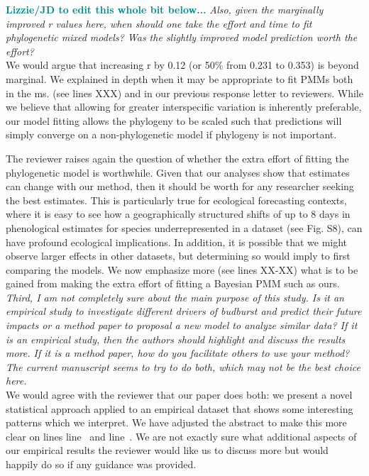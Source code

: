 \documentclass[11pt]{article}
\newcommand{\lr}[1]{line~\lineref{#1}}
\begin{document}
\textcolor{teal}{{\bf Lizzie/JD to edit this whole bit below...}}
\emph{Also, given the marginally improved r values here, when should one take the effort and time to fit phylogenetic mixed models? Was the slightly improved model prediction worth the effort?}\\

We would argue that increasing r by 0.12 (or 50\% from 0.231 to 0.353) is beyond marginal. We explained in depth when it may be appropriate to fit PMMs both in the ms. (see lines XXX) and in our previous response letter to reviewers. While we believe that allowing for greater interspecific variation is inherently preferable, our model fitting allows the phylogeny to be scaled such that predictions will simply converge on a non-phylogenetic model if phylogeny is not important. 

The reviewer raises again the question of whether the extra effort of fitting the phylogenetic model is worthwhile. Given that our analyses show that estimates can change with our method, then it should be worth for any researcher seeking the best estimates. This is particularly true for ecological forecasting contexts, where it is easy to see how a geographically structured shifts of up to 8 days in phenological estimates for species underrepresented in a dataset (see Fig. S8), can have profound ecological implications. In addition, it is possible that we might observe larger effects in other datasets, but determining so would imply to first comparing the models. We now emphasize more (see lines XX-XX) what is to be gained from making the extra effort of fitting a Bayesian PMM such as ours.\\

\emph{Third, I am not completely sure about the main purpose of this study. Is it an empirical study to investigate different drivers of budburst and predict their future impacts or a method paper to proposal a new model to analyze similar data? If it is an empirical study, then the authors should highlight and discuss the results more. If it is a method paper, how do you facilitate others to use your method? The current manuscript seems to try to do both, which may not be the best choice here.}\\

We would agree with the reviewer that our paper does both: we present a novel statistical approach applied to an empirical dataset that shows some interesting patterns which we interpret. We have adjusted the abstract to make this more clear on lines \lr{whatisyourpaper1} and \lr{whatisyourpaper2}. We are not exactly sure what additional aspects of our empirical results the reviewer would like us to discuss more but would happily do so if any guidance was provided. 
\end{document}
